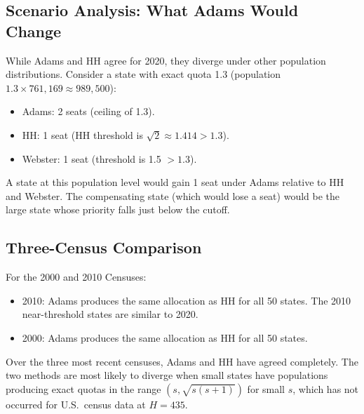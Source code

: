 \subsection{Scenario Analysis: What Adams Would Change}

While Adams and HH agree for 2020, they diverge under other population
distributions.
Consider a state with exact quota 1.3 (population $1.3 \times 761{,}169
\approx 989{,}500$):
\begin{itemize}
  \item Adams: 2 seats (ceiling of 1.3).
  \item HH: 1 seat (HH threshold is $\sqrt{2} \approx 1.414 > 1.3$).
  \item Webster: 1 seat (threshold is 1.5 $> 1.3$).
\end{itemize}
A state at this population level would gain 1 seat under Adams
relative to HH and Webster.
The compensating state (which would lose a seat) would be
the large state whose priority falls just below the cutoff.

\subsection{Three-Census Comparison}

For the 2000 and 2010 Censuses:
\begin{itemize}
  \item 2010: Adams produces the same allocation as HH for all 50 states.
    The 2010 near-threshold states are similar to 2020.
  \item 2000: Adams produces the same allocation as HH for all 50 states.
\end{itemize}
Over the three most recent censuses, Adams and HH have agreed completely.
The two methods are most likely to diverge when small states have
populations producing exact quotas in the range $(s, \sqrt{s(s+1)})$
for small $s$, which has not occurred for U.S.\ census data at $H = 435$.
